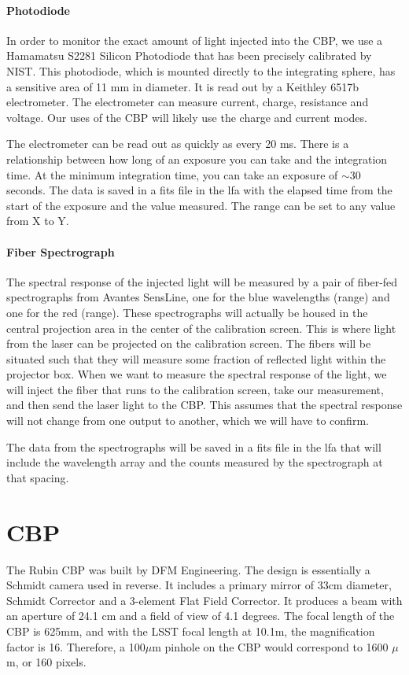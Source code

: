 \documentclass[SE,authoryear,lsstdraft,toc]{lsstdoc}
\begin{document}
\paragraph{\textbf{Photodiode}}

In order to monitor the exact amount of light injected into the CBP, we use a Hamamatsu S2281 Silicon Photodiode that has been precisely calibrated by NIST. 
This photodiode, which is mounted directly to the integrating sphere, has a sensitive area of 11 mm in diameter. It is read out by a Keithley 6517b electrometer. The electrometer can measure current, charge, resistance and voltage. Our uses of the CBP will likely use the charge and current modes. 

The electrometer can be read out as quickly as every 20 ms. There is a relationship between how long of an exposure you can take and the integration time. At the minimum integration time, you can take an exposure of $\sim$30 seconds. The data is saved in a fits file in the lfa with the elapsed time from the start of the exposure and the value measured. The range can be set to any value from X to Y. 

\paragraph{\textbf{Fiber Spectrograph}}

The spectral response of the injected light will be measured by a pair of fiber-fed spectrographs from Avantes SensLine, one for the blue wavelengths (range) and one for the red (range). These spectrographs will actually be housed in the central projection area in the center of the calibration screen. This is where light from the laser can be projected on the calibration screen. The fibers will be situated such that they will measure some fraction of reflected light within the projector box. When we want to measure the spectral response of the light, we will inject the fiber that runs to the calibration screen, take our measurement, and then send the laser light to the CBP. This assumes that the spectral response will not change from one output to another, which we will have to confirm.

The data from the spectrographs will be saved in a fits file in the lfa that will include the wavelength array and the counts measured by the spectrograph at that spacing.

\section{CBP}
The Rubin CBP was built by DFM Engineering. 
The design is essentially a Schmidt camera used in reverse. 
It includes a primary mirror of 33cm diameter, Schmidt Corrector and a 3-element Flat Field Corrector. 
It produces a beam with an aperture of 24.1 cm and a field of view of 4.1 degrees. 
The focal length of the CBP is 625mm, and with the LSST focal length at 10.1m, the magnification factor is 16. Therefore, a 100$\mu$m pinhole on the CBP would correspond to 1600 $\mu$m, or 160 pixels. 
\end{document}
